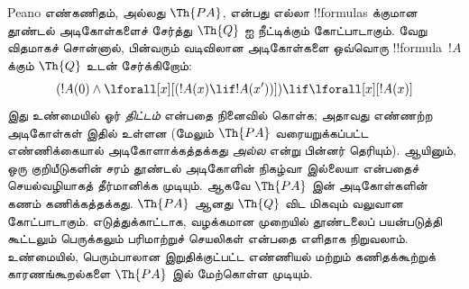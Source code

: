 \documentclass[../../../include/open-logic-section]{subfiles}
\begin{document}



Peano எண்கணிதம், அல்லது $\Th{PA}$, என்பது எல்லா !!{formula}s க்குமான
தூண்டல் அடிகோள்களைச் சேர்த்து $\Th{Q}$ ஐ நீட்டிக்கும் கோட்பாடாகும்.
வேறு விதமாகச் சொன்னால், பின்வரும் வடிவிலான அடிகோள்களை ஒவ்வொரு
!!{formula}~$!A$ க்கும் $\Th{Q}$ உடன் சேர்க்கிறோம்:
\[
(!A(0) \land \lforall[x][(!A(x) \lif !A(x'))]) \lif \lforall[x][!A(x)]
\]
இது உண்மையில் ஓர் \emph{திட்டம்} என்பதை நினைவில் கொள்க; அதாவது
எண்ணற்ற அடிகோள்கள் இதில் உள்ளன (மேலும் $\Th{PA}$ வரையறுக்கப்பட்ட
எண்ணிக்கையால் அடிகோளாக்கத்தக்கது {\em அல்ல} என்று பின்னர் தெரியும்).
ஆயினும், ஒரு குறியீடுகளின் சரம் தூண்டல் அடிகோளின் நிகழ்வா இல்லையா
என்பதைச் செயல்வழியாகத் தீர்மானிக்க முடியும். ஆகவே $\Th{PA}$ இன்
அடிகோள்களின் கணம் கணிக்கத்தக்கது. $\Th{PA}$ ஆனது $\Th{Q}$ விட மிகவும்
வலுவான கோட்பாடாகும். எடுத்துக்காட்டாக, வழக்கமான முறையில் தூண்டலைப்
பயன்படுத்தி கூட்டலும் பெருக்கலும் பரிமாற்றுச் செயலிகள் என்பதை எளிதாக
நிறுவலாம். உண்மையில், பெரும்பாலான இறுதிக்குட்பட்ட எண்ணியல் மற்றும்
கணிதக்கூற்றுக் காரணங்கூறல்களை $\Th{PA}$ இல் மேற்கொள்ள முடியும்.
\end{document}
